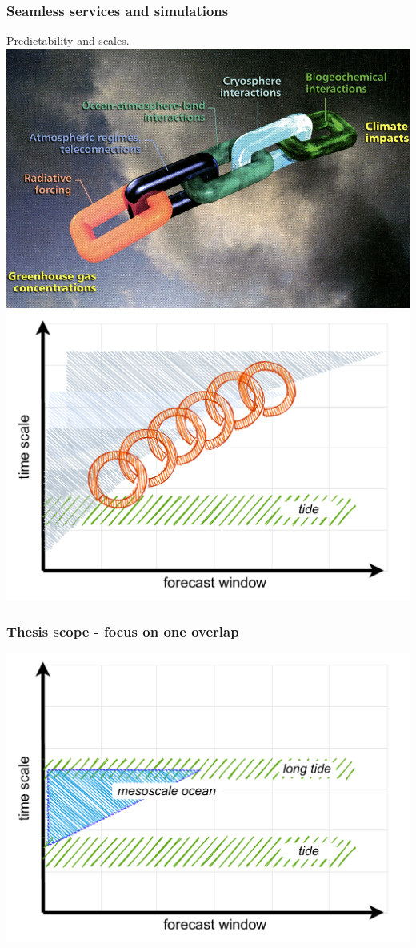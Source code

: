\begin{frame}
\frametitle{Seamless services and simulations }
Predictability and scales.
\includegraphics[height=0.15\textheight]{figures/images/PalmerChain.png}
\includegraphics[height=0.7\textheight]{figures/diagrams/scales_with_chain.pdf}
\end{frame}
\begin{frame}
\frametitle{Thesis scope - focus on one overlap}
     \includegraphics[height=0.7\textheight]{figures/diagrams/scales_focus.pdf}
\end{frame}
